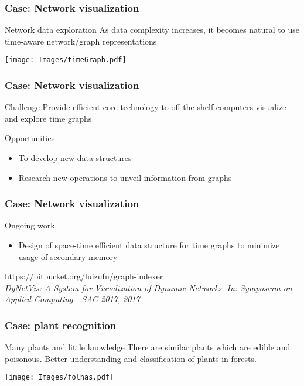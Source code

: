 \documentclass{beamer}
\begin{document}
\begin{frame}\frametitle{Case: Network visualization}

  \begin{alertblock}{Network data exploration}
As data complexity increases, it becomes natural to use time-aware network/graph representations
  \end{alertblock}

  \centering
  \texttt{[image: Images/timeGraph.pdf]}

\end{frame}

\begin{frame}\frametitle{Case: Network visualization}

  \begin{block}{Challenge}
Provide efficient core technology to off-the-shelf computers visualize and explore time graphs
  \end{block}

	\begin{exampleblock}{Opportunities}
    \begin{itemize}
      \item To develop new data structures
      \item Research new operations to unveil information from graphs 
    \end{itemize}
	\end{exampleblock}
\end{frame}

\begin{frame}\frametitle{Case: Network visualization}
  \begin{alertblock}{Ongoing work}
    \begin{itemize}
      \item Design of space-time efficient data structure for time graphs to minimize usage of secondary memory
    \end{itemize}
  \end{alertblock}

  https://bitbucket.org/luizufu/graph-indexer\\
  \textit{DyNetVis: A System for Visualization of Dynamic Networks. In: Symposium on Applied Computing - SAC 2017, 2017}

\end{frame}



\begin{frame}\frametitle{Case: plant recognition}

\begin{alertblock}{Many plants and little knowledge}
There are similar plants which are edible and poisonous.
Better understanding and classification of plants in forests.
\end{alertblock}

\centering
  \texttt{[image: Images/folhas.pdf]}
\end{frame}
\end{document}
